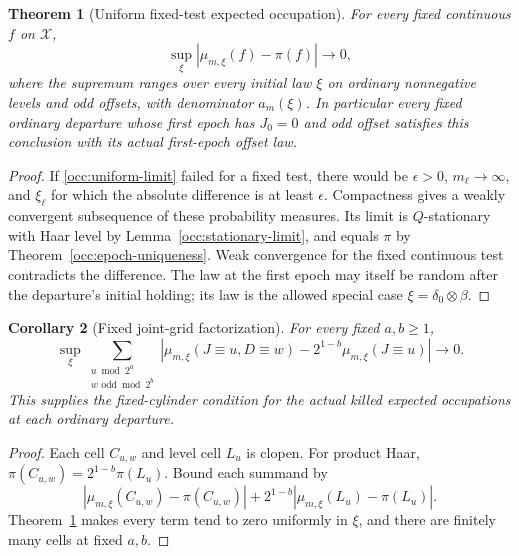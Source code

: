 \documentclass[11pt]{amsart}
\newtheorem{theorem}{Theorem}[section]
\newtheorem{corollary}[theorem]{Corollary}
\theoremstyle{definition}
\theoremstyle{remark}
\begin{document}
\begin{theorem}[Uniform fixed-test expected occupation]\label{occ:uniform-convergence}
For every fixed continuous $f$ on $\mathcal X$,
\begin{equation}
 \sup_\xi|\mu_{m,\xi}(f)-\pi(f)|\longrightarrow0,
 \label{occ:uniform-limit}
\end{equation}
where the supremum ranges over every initial law $\xi$ on ordinary
nonnegative levels and odd offsets, with denominator $a_m(\xi)$.
In particular every fixed ordinary departure whose first epoch has $J_0=0$ and odd offset satisfies this conclusion with its actual
first-epoch offset law.
\end{theorem}
\begin{proof}
If \eqref{occ:uniform-limit} failed for a fixed test, there would be
$\epsilon>0$, $m_\ell\to\infty$, and $\xi_\ell$ for which the
absolute difference is at least $\epsilon$.  Compactness gives a weakly
convergent subsequence of these probability measures.  Its limit is
$Q$-stationary with Haar level by Lemma~\ref{occ:stationary-limit},
and equals $\pi$ by Theorem~\ref{occ:epoch-uniqueness}.  Weak convergence
for the fixed continuous test contradicts the difference.  The law at
the first epoch may itself be random after the departure's initial
holding; its law is the allowed special case $\xi=\delta_0\otimes\beta$.
\end{proof}

\begin{corollary}[Fixed joint-grid factorization]\label{occ:fc}
For every fixed $a,b\ge1$,
\begin{equation}
 \sup_\xi\sum_{\substack{u\bmod2^a\\w\text{ odd}\bmod2^b}}
 \left|\mu_{m,\xi}(J\equiv u,D\equiv w)
       -2^{1-b}\mu_{m,\xi}(J\equiv u)\right|
 \longrightarrow0.
 \label{occ:FC}
\end{equation}
This supplies the fixed-cylinder condition for the actual killed
expected occupations at each ordinary departure.
\end{corollary}
\begin{proof}
Each cell $C_{u,w}$ and level cell $L_u$ is clopen.  For product Haar,
$\pi(C_{u,w})=2^{1-b}\pi(L_u)$.  Bound each summand by
\[
 |\mu_{m,\xi}(C_{u,w})-\pi(C_{u,w})|
 +2^{1-b}|\mu_{m,\xi}(L_u)-\pi(L_u)|.
\]
Theorem~\ref{occ:uniform-convergence} makes every term tend to zero
uniformly in $\xi$, and there are finitely many cells at fixed $a,b$.
\end{proof}
\end{document}
